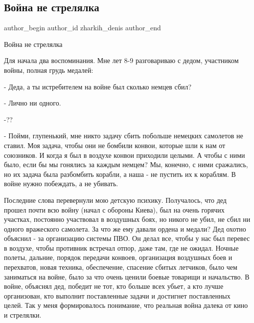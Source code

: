  
 
 
 
 
 
\subsection{Война не стрелялка}
\label{sec:20_02_2022.fb.zharkih_denis.1.vojna_ne_streljalka}
 
\ifcmt
 author_begin
   author_id zharkih_denis
 author_end
\fi

Война не стрелялка

Для начала два воспоминания. Мне лет 8-9 разговариваю с дедом, участником
войны, полная грудь медалей:

- Деда, а ты истребителем на войне был сколько немцев сбил?

- Лично ни одного. 

-??

- Пойми, глупенький, мне никто задачу сбить побольше немецких самолетов не
ставил. Моя задача, чтобы они не бомбили конвои, которые шли к нам от
союзников. И когда я был в воздухе конвои приходили целыми. А чтобы с ними
было, если бы мы гонялись за каждым немцем? Мы, конечно, с ними сражались, но
их задача была разбомбить корабли, а наша - не пустить их к кораблям. В войне
нужно побеждать, а не убивать. 


Последние слова перевернули мою детскую психику. Получалось, что дед прошел
почти всю войну (начал с обороны Киева), был на очень горячих участках,
постоянно участвовал в воздушных боях, но никого не убил, не сбил ни одного
вражеского самолета. За что же ему давали ордена и медали? Дед охотно объяснил
- за организацию системы ПВО. Он делал все, чтобы у нас был перевес в воздухе,
чтобы противник встречал отпор, даже там, где не ожидал. Ночные полеты,
дальние, порядок передачи конвоев, организация воздушных боев и перехватов,
новая техника, обеспечение, спасение сбитых летчиков, было чем заниматься на
войне, было за что очень ценили боевые товарищи и начальство. В войне, объяснял
дед, победит не тот, кто больше всех убьет, а кто лучше организован, кто
выполнит поставленные задачи и достигнет поставленных целей.  Так у меня
формировалось понимание, что реальная война далека от кино и стрелялки. 

